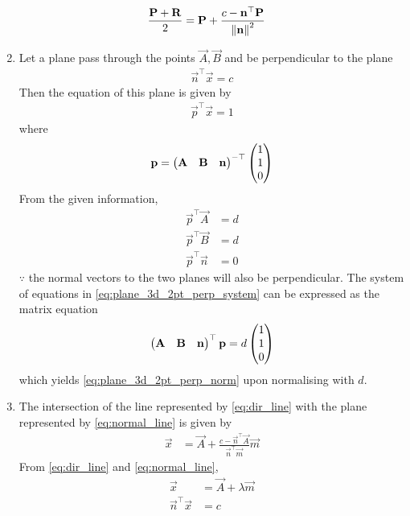 \documentclass[journal,12pt,onecolumn]{IEEEtran}
\renewcommand\thesection{\arabic{section}}
\renewcommand\thesubsection{\thesection.\arabic{subsection}}
\begin{document}
\begin{enumerate}[label=\thesubsection.\arabic*.,ref=\thesubsection.\theenumi]
\begin{align}
			\frac{\mathbf{P}+\mathbf{R}}{2} &=
	  \mathbf{P} + \frac{c - \mathbf{n}^{\top}\mathbf{P}}{\left\lVert\mathbf{n}\right\rVert^2}
		\end{align}
		\item Let a plane pass through the points $\vec{A},\vec{B}$ and be perpendicular to the plane 
		\begin{align}
		\vec{n}^{\top}\vec{x} =c 
			\label{eq:plane_3d_2pt_perp_given}
		\end{align}
		Then the equation of this plane is given by 
		\begin{align}
		\vec{p}^{\top}\vec{x} = 1
			\label{eq:plane_3d_2pt}
		\end{align}
		where
		\begin{align}
			\mathbf{p} = 		\begin{pmatrix}\mathbf{A} & \mathbf{B} & \mathbf{n}\end{pmatrix}^{-\top}  \begin{pmatrix}1 \\ 1 \\ 0\end{pmatrix}
			\label{eq:plane_3d_2pt_perp_norm}
		\end{align}
	\solution From the given information, 
		\begin{align}
			\vec{p}^{\top}\vec{A} &=d 
			\\
			\vec{p}^{\top}\vec{B} &=d 
			\\
			\vec{p}^{\top}\vec{n} &= 0
			\label{eq:plane_3d_2pt_perp_system}
		\end{align}
		$\because$ the normal vectors to the two planes will also be perpendicular.  The system of equations in 
			\eqref{eq:plane_3d_2pt_perp_system}
			can be expressed as the matrix equation
		\begin{align}
			\begin{pmatrix}\mathbf{A} & \mathbf{B} & \mathbf{n}\end{pmatrix}^{\top}\mathbf{p} = d\begin{pmatrix}1 \\ 1 \\ 0\end{pmatrix}
			\label{eq:plane_3d_2pt_perp_system_temp}
		\end{align}
		which yields 
			\eqref{eq:plane_3d_2pt_perp_norm}
			upon normalising with $d$.
		\item The intersection of the line represented by 
	\eqref{eq:dir_line}
	with the plane represented by 
	\eqref{eq:normal_line}
	is given by 
\begin{align}
	\label{eq:dir_line_plane_isect}
	\vec{x} &= \vec{A} + \frac{c - \vec{n}^{\top}\vec{A}}{\vec{n}^{\top}\vec{m}}
\vec{m}
\end{align}
\solution From 
	\eqref{eq:dir_line}
	and 
	\eqref{eq:normal_line},
\begin{align}
	\vec{x} &= \vec{A} + \lambda \vec{m}
	\\
	\vec{n}^{\top}\vec{x} &= c
	\\

\end{align}
\end{enumerate}
\end{document}
